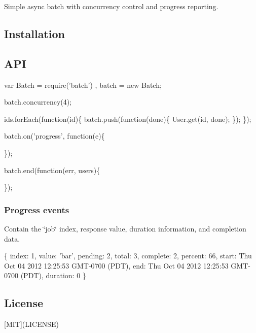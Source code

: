 Simple async batch with concurrency control and progress reporting.

\subsection*{Installation}




\subsection*{A\+PI}


\begin{DoxyCode}
var Batch = require('batch')
  , batch = new Batch;

batch.concurrency(4);

ids.forEach(function(id)\{
  batch.push(function(done)\{
    User.get(id, done);
  \});
\});

batch.on('progress', function(e)\{

\});

batch.end(function(err, users)\{

\});
\end{DoxyCode}


\subsubsection*{Progress events}

Contain the \char`\"{}job\char`\"{} index, response value, duration information, and completion data.


\begin{DoxyCode}
\{ index: 1,
  value: 'bar',
  pending: 2,
  total: 3,
  complete: 2,
  percent: 66,
  start: Thu Oct 04 2012 12:25:53 GMT-0700 (PDT),
  end: Thu Oct 04 2012 12:25:53 GMT-0700 (PDT),
  duration: 0 \}
\end{DoxyCode}


\subsection*{License}

\mbox{[}M\+IT\mbox{]}(L\+I\+C\+E\+N\+SE) 